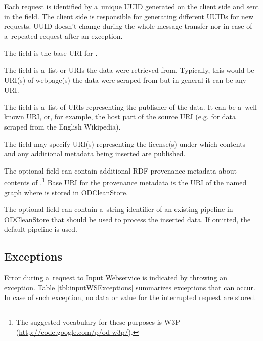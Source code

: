 Each request is identified by a~unique UUID generated on the client side and sent in the  field.
The client side is responsible for generating different UUIDs for new requests.
UUID doesn't change during the whole message transfer nor in case of a~repeated request after an exception.

The  field is the base URI for .

The  field is a~list or URIs the data were retrieved from. Typically, this would be URI(s) of webpage(s) the data were scraped from but in general it can be any URI.

The  field is a~list of URIs representing the publisher of the data. It can be a~well known URI, or, for example, the host part of the source URI (e.g. \linebreak[4] for data scraped from the English Wikipedia).

The  field may specify URI(s) representing the license(s) under which  contents and any additional  metadata being inserted are published. 

The optional  field can contain additional RDF provenance metadata about contents of .\footnote{The suggested vocabulary for these purposes is W3P (\url{http://code.google.com/p/od-w3p/}).} Base URI for the provenance metadata is the URI of the named graph where  is stored in ODCleanStore.

The optional  field can contain a~string identifier of an existing pipeline in ODCleanStore that should be used to process the inserted data. If omitted, the default pipeline is used. 

\subsection{Exceptions}

Error during a~request to Input Webservice is indicated by throwing an exception. Table \ref{tbl:inputWSExceptions} summarizes exceptions that can occur. In case of such exception, no data or  value for the interrupted request are stored.


